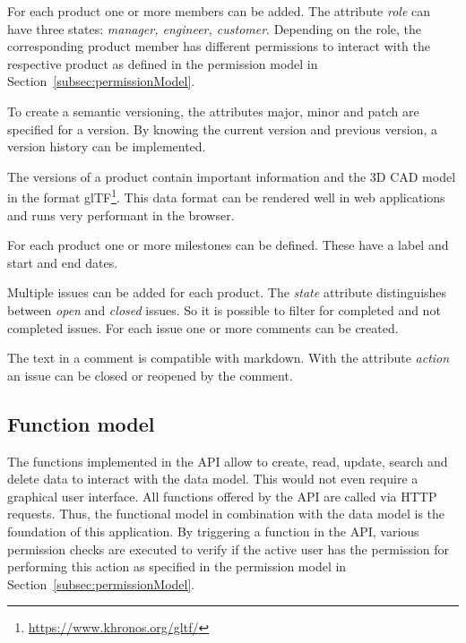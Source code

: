     For each product one or more members can be added.
    The attribute \textit{role} can have three states: \textit{manager, engineer, customer}.
    Depending on the role, the corresponding product member has different permissions to interact with the respective product as defined in the permission model in Section~\ref{subsec:permissionModel}. 

    To create a semantic versioning, the attributes major, minor and patch are specified for a version.
    By knowing the current version and previous version, a version history can be implemented.

    The versions of a product contain important information and the 3D CAD model in the format glTF\footnote{\url{https://www.khronos.org/gltf/}}.
    This data format can be rendered well in web applications and runs very performant in the browser.

    For each product one or more milestones can be defined.
    These have a label and start and end dates.

    Multiple issues can be added for each product.
    The \textit{state} attribute distinguishes between \textit{open} and \textit{closed} issues.
    So it is possible to filter for completed and not completed issues. For each issue one or more comments can be created.

    The text in a comment is compatible with markdown.
    With the attribute \textit{action} an issue can be closed or reopened by the comment.

    \subsection*{Function model} 
    The functions implemented in the API allow to create, read, update, search and delete data to interact with the data model. This would not even require a graphical user interface. All functions offered by the API are called via HTTP requests. Thus, the functional model in combination with the data model is the foundation of this application. 
    By triggering a function in the API, various permission checks are executed to verify if the active user has the permission for performing this action as specified in the permission model in Section~\ref{subsec:permissionModel}. 

